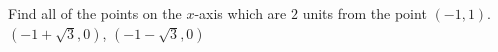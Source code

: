 {Find all of the points on the $x$-axis which are $2$ units from the point $(-1,1)$.}
{$(-1+\sqrt{3},0)$, $(-1-\sqrt{3},0)$}